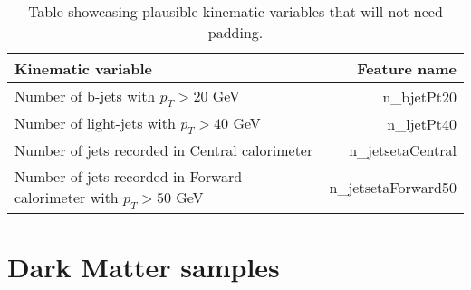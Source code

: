 \documentclass[14pt, a4paper]{book}
\begin{document}
\begin{table}[!h]
    \centering
    \begin{tabular}{l|r}\midrule\midrule
        Kinematic variable                                                      & Feature name          \\\midrule
        Number of b-jets with $p_T > 20$ GeV                                    & n\_bjetPt20\\
        Number of light-jets with $p_T > 40$ GeV                                & n\_ljetPt40\\
        Number of jets recorded in Central calorimeter                          &n\_jetsetaCentral\\
        Number of jets recorded in Forward calorimeter with $p_T > 50$ GeV      & n\_jetsetaForward50\\\midrule\midrule
    \end{tabular}
    \caption[New kinematic variables that need no padding]{Table showcasing plausible kinematic variables that will not need padding.}
    \label{tab:padding_variables}
\end{table}

\section{Dark Matter samples}
\end{document}
